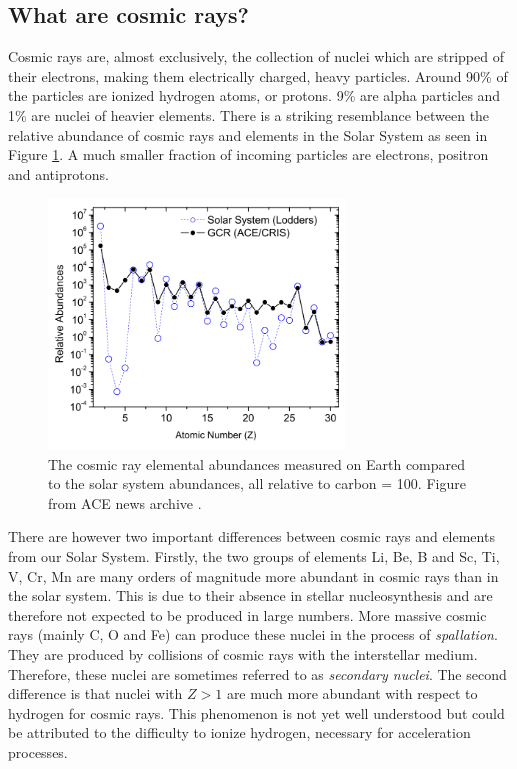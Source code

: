 \subsection{What are cosmic rays?}
\label{subsec:whatarecosmicrays}
Cosmic rays are, almost exclusively, the collection of nuclei which are stripped of their electrons, making them electrically charged, heavy particles. Around 90\% of the particles are ionized hydrogen atoms, or protons. 9\% are alpha particles and 1\% are nuclei of heavier elements. There is a striking resemblance between the relative abundance of cosmic rays and elements in the Solar System as seen in Figure \ref{fig:relabundance}. A much smaller fraction of incoming particles are electrons, positron and antiprotons.

\begin{figure}
\centering
\includegraphics[width=0.7\textwidth]{./chapter3/img/relativeabundanceACE.png}
\caption{The cosmic ray elemental abundances measured on Earth compared to the solar system abundances, all relative to carbon = 100. Figure from ACE news archive \cite{ISRAEL2005201}.}
\label{fig:relabundance}
\end{figure}
There are however two important differences between cosmic rays and elements from our Solar System. Firstly, the two groups of elements Li, Be, B and Sc, Ti, V, Cr, Mn are many orders of magnitude more abundant in cosmic rays than in the solar system. This is due to their absence in stellar nucleosynthesis and are therefore not expected to be produced in large numbers. More massive cosmic rays (mainly C, O and Fe) can produce these nuclei in the process of \textit{spallation}. They are produced by collisions of cosmic rays with the interstellar medium. Therefore, these nuclei are sometimes referred to as \textit{secondary nuclei}.
The second difference is that nuclei with $Z>1$ are much more abundant with respect to hydrogen for cosmic rays. This phenomenon is not yet well understood but could be attributed to the difficulty to ionize hydrogen, necessary for acceleration processes.

